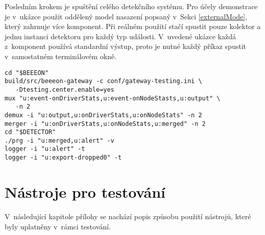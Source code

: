 \documentclass[thesis=M,czech]{FITthesis}[2012/06/26]
\begin{document}
\begin{enumerate}
Posledním krokem je spuštění celého detekčního systému. Pro účely demonstrace je
v~ukázce použit oddělený model nasazení popsaný v~Sekci \ref{externalMode}, který zahrnuje více komponent. Při reálném 
použití stačí spustit pouze kolektor a jednu instanci detektoru pro každý typ události. V~uvedené
ukázce každá z~komponent používá standardní výstup, proto je nutné každý příkaz spustit v~samostatném
terminálovém okně.
\begin{verbatim}
cd "$BEEEON" 
build/src/beeeon-gateway -c conf/gateway-testing.ini \
   -Dtesting.center.enable=yes 
mux "u:event-onDriverStats,u:event-onNodeStasts,u:output" \
   -n 2
demux -i "u:output,u:onDriverStats,u:onNodeStats" -n 2
merger -i "u:onDriverStats,u:onNodeStats,u:merged" -n 2
cd "$DETECTOR" 
./prg -i "u:merged,u:alert" -v
logger -i "u:alert" -t
logger -i "u:export-dropped0" -t
\end{verbatim}
\end{enumerate}


\chapter{Nástroje pro testování}
V~následující kapitole přílohy se nachází popis způsobu použití nástrojů, které byly uplatněny 
v~rámci testování.
\end{document}
